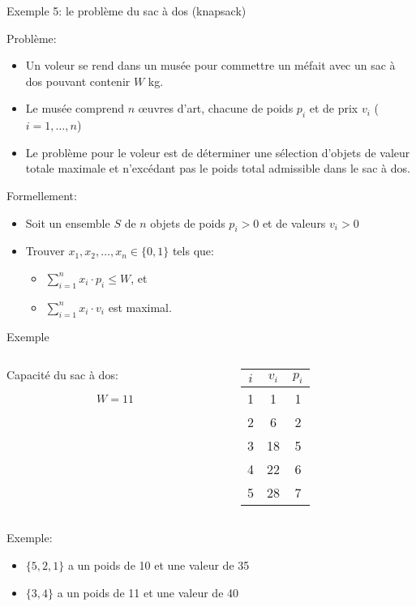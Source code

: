\begin{frame}{Exemple 5: le problème du sac à dos (knapsack)}

Problème:
\begin{itemize}
\item Un voleur se rend dans un musée pour commettre un méfait avec un
  sac à dos pouvant contenir $W$ kg.
\item Le musée comprend $n$ \oe uvres d'art, chacune de poids $p_i$ et
  de prix $v_i$ ($i=1,\ldots,n$)
\item Le problème pour le voleur est de déterminer une sélection
  d'objets de valeur totale maximale et n'excédant pas le poids total
  admissible dans le sac à dos.
\end{itemize}

\bigskip

Formellement:
\begin{itemize}
\item Soit un ensemble $S$ de $n$ objets de poids $p_i>0$ et de valeurs $v_i>0$
\item Trouver $x_1, x_2, \ldots, x_n \in \{0,1\}$ tels que:
\begin{itemize}
\item $\sum_{i=1}^n x_i\cdot p_i\leq W$, et
\item $\sum_{i=1}^n x_i\cdot v_i$ est maximal.
\end{itemize}
\end{itemize}

\end{frame}

\begin{frame}{Exemple}

\begin{columns}
\begin{column}{5cm}

Capacité du sac à dos:

$$W=11$$
\end{column}
\begin{column}{5cm}
\begin{center}
\begin{tabular}{ccc}
$i$ & $v_i$ & $p_i$\\
\hline
1 & 1 & 1\\
2 & 6 & 2\\
3 & 18 & 5\\
4 & 22 & 6\\
5 & 28 & 7
\end{tabular}
\end{center}
\end{column}
\end{columns}

\bigskip

Exemple:
\begin{itemize}
\item $\{5,2,1\}$ a un poids de 10 et une valeur de 35
\item $\{3,4\}$ a un poids de 11 et une valeur de 40
\end{itemize}

\end{frame}

